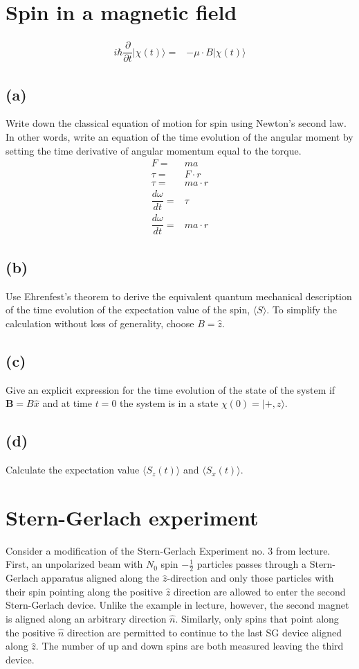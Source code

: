 \documentclass[12pt, a4paper]{article}
\begin{document}
\section{Spin in a magnetic field}
\begin{align*}
i\hbar \dfrac{\partial}{\partial t} |\chi(t)\rangle =& -\mu\cdot B|\chi(t)\rangle
\end{align*}
\subsection*{(a)}
Write down the classical equation of motion for spin using Newton's second law. In other words, write an equation of the time evolution of the angular moment by setting the time derivative of angular momentum equal to the torque.
\begin{align*}
F =& ma
\\
\tau =& F\cdot r
\\
\tau =& ma\cdot r
\\
\dfrac{d\omega}{dt} =& \tau
\\
\dfrac{d\omega}{dt} =& ma\cdot r
\end{align*}

\subsection*{(b)}
Use Ehrenfest’s theorem to derive the equivalent quantum mechanical description of the time evolution of the expectation value of the spin, $\langle S\rangle$. To simplify the calculation without loss of
generality, choose $B = \hat{z}$.

\subsection*{(c)}
Give an explicit expression for the time evolution of the state of the system if $\textbf{B} = B\hat{x}$ and at time $t = 0$ the system is in a state $\chi(0) = |+, z\rangle$.

\subsection*{(d)}
Calculate the expectation value $\langle S_z(t)\rangle$ and $\langle S_x(t)\rangle$.



\section{Stern-Gerlach experiment}
Consider a modification of the Stern-Gerlach Experiment no. 3 from lecture. First, an unpolarized beam  with $N_0$ spin $-\frac{1}{2}$ particles passes through a Stern-Gerlach apparatus aligned along the $\hat{z}$-direction and only those particles with their spin pointing along the positive $\hat{z}$ direction are allowed to enter the second Stern-Gerlach device. Unlike the example in lecture, however, the second magnet is aligned along an arbitrary direction $\hat{n}$. Similarly, only spins that point along the positive $\hat{n}$ direction are permitted to continue to the last SG device aligned along $\hat{z}$. The number of up and down spins are both measured leaving the third device.
\end{document}
